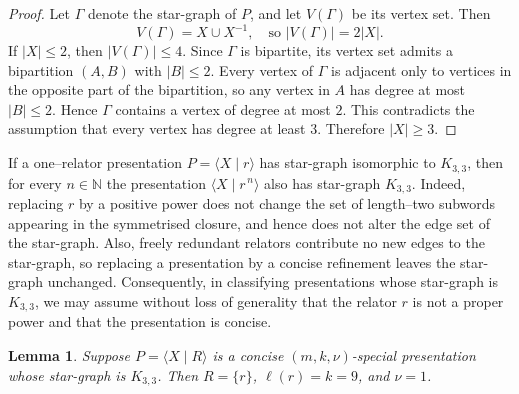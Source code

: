 \documentclass[a4paper,12pt,oneside]{article}
\newtheorem{lem}[theorem]{Lemma}
\begin{document}
\begin{proof}
Let $\Gamma$ denote the star-graph of $P$, and let $V(\Gamma)$ be its vertex set. Then
\[
V(\Gamma)=X \cup X^{-1},
\quad \text{so } |V(\Gamma)|=2|X|.
\]
If $|X|\le 2$, then $|V(\Gamma)|\le 4$. Since $\Gamma$ is bipartite, its vertex set admits a bipartition $(A, B)$ with $|B|\le 2$. Every vertex of $\Gamma$ is adjacent only to vertices in the opposite part of the bipartition, so any vertex in $A$ has degree at most $|B|\le 2$. Hence $\Gamma$ contains a vertex of degree at most $2$. This contradicts the assumption that every vertex has degree at least $3$. Therefore $|X|\ge 3$.
\end{proof}


\medskip
If a one–relator presentation $P=\langle X \mid r\rangle$ has star-graph isomorphic to $K_{3,3}$, then for every $n\in\mathbb{N}$ the presentation $\langle X \mid r^{\,n}\rangle$ also has star-graph $K_{3,3}$. Indeed, replacing $r$ by a positive power does not change the set of length--two subwords appearing in the symmetrised closure, and hence does not alter the edge set of the star-graph.  Also, freely redundant relators contribute no new edges to the star-graph, so replacing a presentation by a concise refinement leaves the star-graph unchanged. Consequently, in classifying presentations whose star-graph is $K_{3,3}$, we may assume without loss of generality that the relator $r$ is not a proper power and that the presentation is concise.

\begin{lem}\label{lem:k33}
Suppose $P = \langle X \mid R \rangle$ is a concise $(m,k,\nu)$-special presentation whose star-graph is $K_{3,3}$. Then $R=\{r\}$, $\ell(r)=k=9$, and $\nu=1$.
\end{lem}
\end{document}
